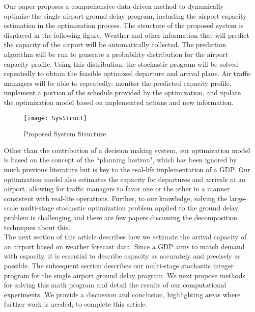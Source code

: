 \documentclass[12pt]{article}
\begin{document}
	\newline
	Our paper proposes a comprehensive data-driven method to dynamically optimize the single airport ground delay program, including the airport capacity estimation in the optimization process. The structure of the proposed system is displayed in the following figure. Weather and other information that will predict the capacity of the airport will be automatically collected. The prediction algorithm will be run to generate a probability distribution for the airport capacity profile. Using this distribution, the stochastic program will be solved repeatedly to obtain the feasible optimized departure and arrival plans. Air traffic managers will be able to repeatedly: monitor the predicted capacity profile, implement a portion of the schedule provided by the optimization, and update the optimization model based on implemented actions and new information.\\
	\begin{figure}[H]
		\centering
		\texttt{[image: SysStruct]}
		\caption{Proposed System Structure}
		\label{fig:struct}
	\end{figure}
	\noindent Other than the contribution of a decision making system, our optimization model is based on the concept of the ``planning horizon", which has been ignored by much previous literature but is key to the real-life implementation of a GDP.  Our optimization model also estimates the capacity for departures and arrivals at an airport, allowing for traffic managers to favor one or the other in a manner consistent with real-life operations. Further, to our knowledge, solving the large-scale multi-stage stochastic optimization problem applied to the ground delay problem is challenging and there are few papers discussing the decomposition techniques about this. \\
	\newline
	The next section of this article describes how we estimate the arrival capacity of an airport based on weather forecast data.  Since a GDP aims to match demand with capacity, it is essential to describe capacity as accurately and precisely as possible. The subsequent section describes our multi-stage stochastic integer program for the single airport ground delay program. We next propose methods for solving this math program and detail the results of our computational experiments.  We provide a discussion and conclusion, highlighting areas where further work is needed, to complete this article.
	
\end{document}
